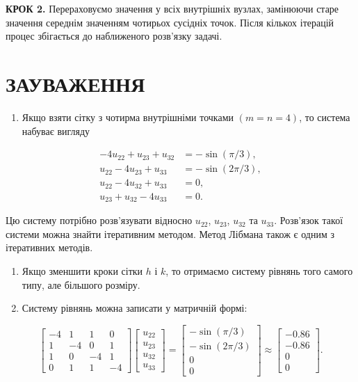 \documentclass[
  ukrainian,
]{article}
\providecommand{\tightlist}{%
  \setlength{\itemsep}{0pt}\setlength{\parskip}{0pt}}
\begin{document}
\textbf{КРОК 2.} Перераховуємо значення у всіх внутрішніх вузлах,
замінюючи старе значення середнім значенням чотирьох сусідніх точок.
Після кількох ітерацій процес збігається до наближеного розв'язку
задачі.

\section{ЗАУВАЖЕННЯ}\label{ux437ux430ux443ux432ux430ux436ux435ux43dux43dux44f-12}

\begin{enumerate}
\def\labelenumi{\arabic{enumi}.}
\tightlist
\item
  Якщо взяти сітку з чотирма внутрішніми точками \((m=n=4)\), то система
  набуває вигляду
\end{enumerate}

\[\begin{aligned}-4u_{22} + u_{23} + u_{32} &= -\sin(\pi/3),\\u_{22} - 4u_{23} + u_{33} &= -\sin(2\pi/3),\\u_{22} - 4u_{32} + u_{33} &= 0,\\u_{23} + u_{32} - 4u_{33} &= 0.\end{aligned}\]

Цю систему потрібно розв'язувати відносно \(u_{22}\), \(u_{23}\),
\(u_{32}\) та \(u_{33}\). Розв'язок такої системи можна знайти
ітеративним методом. Метод Лібмана також є одним з ітеративних методів.

\begin{enumerate}
\def\labelenumi{\arabic{enumi}.}
\setcounter{enumi}{1}
\item
  Якщо зменшити кроки сітки \(h\) і \(k\), то отримаємо систему рівнянь
  того самого типу, але більшого розміру.
\item
  Систему рівнянь можна записати у матричній формі:
\end{enumerate}

\[\begin{bmatrix}-4 & 1 & 1 & 0 \\1 & -4 & 0 & 1 \\1 & 0 & -4 & 1 \\0 & 1 & 1 & -4\end{bmatrix}\begin{bmatrix}u_{22}\\u_{23}\\u_{32}\\u_{33}\end{bmatrix}=\begin{bmatrix}-\sin(\pi/3)\\-\sin(2\pi/3)\\0\\0\end{bmatrix}\approx\begin{bmatrix}-0.86\\-0.86\\0\\0\end{bmatrix}.\]
\end{document}
